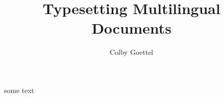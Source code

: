 \documentclass{acm_proc_article-sp}
\title{Typesetting Multilingual Documents}
\author{Colby Goettel}
\begin{document}
\maketitle


some text



\nocite{*}
\end{document}
